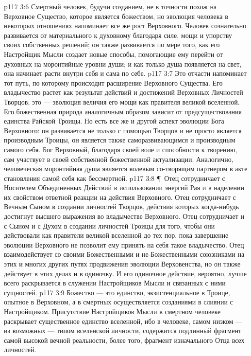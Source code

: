 \vs p117 3:6 Смертный человек, будучи созданием, не в точности похож на Верховное Существо, которое является божеством, но эволюция человека в некоторых отношениях напоминает все же рост Верховного. Человек сознательно развивается от материального к духовному благодаря силе, мощи и упорству своих собственных решений; он также развивается по мере того, как его Настройщик Мысли создает новые способы, помогающие ему перейти от духовных на моронтийные уровни души; и как только душа появляется на свет, она начинает расти внутри себя и сама по себе.
\vs p117 3:7 Это отчасти напоминает тот путь, по которому происходит расширение Верховного Существа. Его владычество растет как результат действий и достижений Верховных Личностей Творцов; это --- эволюция величия его мощи как правителя великой вселенной. Его божественная природа аналогичным образом зависит от предсуществования единства Райской Троицы. Но есть все же и другой аспект эволюции Бога Верховного: он развивается не только с помощью Творцов и не просто является производным Троицы, он является также саморазвивающимся и производным самого себя. Бог Верховный, благодаря своей воле и способности к творению, сам участвует в своей собственной божественной актуализации. Аналогично, человеческая моронтийная душа является волевым со\hyp{}творящим партнером в акте становления самой себя как бессмертной.
\vs p117 3:8 \P\ Отец сотрудничает с Носителем Объединенных Действий в использовании энергий Рая и в наделении их свойством ответной реакции на действия Верховного. Отец сотрудничает с Вечным Сыном в создании личностей Творцов, действия которых когда\hyp{}нибудь достигнут высшего выражения во владычестве Верховного. Отец сотрудничает и с Сыном и с Духом в создании личностей Троицы для того, чтобы они действовали как правители великой вселенной до тех пор, пока завершение эволюции Верховного не позволит ему принять на себя такое владычество. Отец взаимодействует со своими Божественными и не\hyp{}Божественными союзниками на этих и многих других путях продвижения эволюции Верховенства, но он также действует в этих делах и в одиночку. И его одиночное действие, вероятно, лучше всего раскрывается в служении Настройщиков Мысли и связанных с ними сущностей.
\vs p117 3:9 Божество --- это единство, экзистенциальное в Троице, опытное в Верховном, а в смертных осуществляется созданиями в слиянии с Настройщиком. Присутствие Настройщиков Мысли в смертном человеке раскрывает существенное единство вселенной, ибо в человеке, самом низком --- из возможных --- типом вселенской личности, содержится подлинный фрагмент самой высокой вечной реальности, более того, фрагмент изначального Отца всех личностей.
